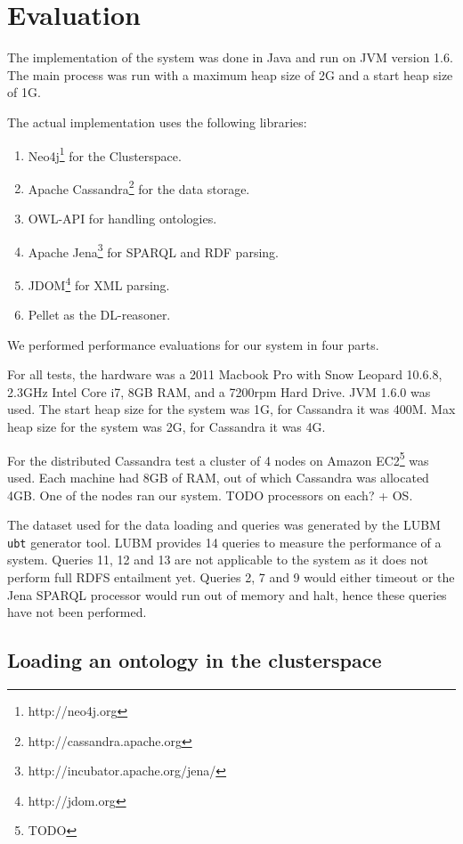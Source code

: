 \documentclass[conference]{IEEEtran}
\begin{document}
\section{Evaluation}

The implementation of the system was done in Java and run on JVM version 1.6. The main
process was run with a maximum heap size of 2G and a start heap size of 1G.

The actual implementation uses the following libraries:
\begin{enumerate}
    \item Neo4j\footnote{http://neo4j.org} for the Clusterspace.
    \item Apache Cassandra\footnote{http://cassandra.apache.org} for the data storage.
    \item OWL-API\cite{Hor:09} for handling ontologies.
    \item Apache Jena\footnote{http://incubator.apache.org/jena/} for SPARQL and RDF parsing.
    \item JDOM\footnote{http://jdom.org} for XML parsing.
    \item Pellet\cite{Parsia04pellet:an} as the DL-reasoner.
\end{enumerate}

We performed performance evaluations for our system in four parts.

For all tests, the hardware was a 2011 Macbook Pro with Snow Leopard 10.6.8,
2.3GHz Intel Core i7, 8GB RAM, and a 7200rpm Hard Drive.  JVM 1.6.0 was used.
  The start heap size for the system was 1G, for Cassandra it was 400M. Max
  heap size for the system was 2G, for Cassandra it was 4G.

For the distributed Cassandra test a cluster of 4 nodes on Amazon
EC2\footnote{TODO} was used.  Each machine had 8GB of RAM, out of which
Cassandra was allocated 4GB. One of the nodes ran our system. TODO processors on each?
+ OS.

The dataset used for the data loading and queries was generated by the LUBM
\texttt{ubt} generator tool. LUBM provides 14 queries to measure the
performance of a system. Queries 11, 12 and 13 are not applicable to the system
as it does not perform full RDFS entailment yet. Queries 2, 7 and 9 would
either timeout or the Jena SPARQL processor would run out of memory and halt,
hence these queries have not been performed.

\subsection{Loading an ontology in the clusterspace}
\end{document}

